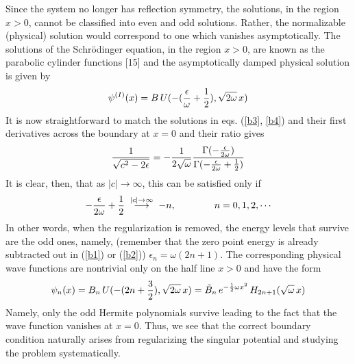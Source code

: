 \documentclass[a4paper,11pt]{article}
\begin{document}
Since the system no longer has reflection symmetry, the solutions, in
the region $x>0$,
cannot be classified into even and odd solutions. Rather, the
normalizable (physical)
solution would correspond to one which vanishes asymptotically. The
solutions of the Schr\"{o}dinger equation, in the region $x>0$, are
known as the parabolic cylinder functions [15] and the asymptotically
damped physical solution is given by
\begin{equation}
\psi^{(I)}(x) = B\,U(-({\epsilon\over\omega}+{1\over 2}),
\sqrt{2\omega}\,x)\label{b4} 
\end{equation}
It is now straightforward to match the solutions in eqs. (\ref{b3},
\ref{b4}) and their first derivatives across the boundary at $x=0$ and
their ratio gives
\begin{equation}
\frac{1}{\sqrt{c^{2}-2\epsilon}} =
-\frac{1}{2\sqrt{\omega}}\frac{\Gamma(-{\epsilon\over
2\omega})}{\Gamma(-{\epsilon\over 2\omega}+{1\over 2})}\label{b6}
\end{equation}
It is clear, then, that as $|c|\rightarrow \infty$, this can be
satisfied only if
\begin{equation}
-{\epsilon\over 2\omega} + {1\over 2}\;
 \stackrel{|c|\rightarrow\infty}{\longrightarrow}\; -n,\qquad\qquad
 n=0,1,2,\cdots\label{b7} 
\end{equation}
In other words, when the regularization is removed, the energy levels
that survive are the odd ones, namely, (remember that the zero point
energy is already subtracted out in (\ref{b1}) or (\ref{b2}))
$\epsilon_{n} = \omega (2n + 1)$.
The corresponding physical wave functions are nontrivial only on the half
line $x>0$ and have the form
\begin{equation}
\psi_{n}(x) = B_{n}\,U(-(2n+{3\over 2}), \sqrt{2\omega}\,x) =
\tilde{B}_{n}\,e^{-{1\over 2}\omega
x^{2}}\,H_{2n+1}(\sqrt{\omega}\,x)\label{b9}
\end{equation}
Namely, only the odd Hermite polynomials survive leading to the fact
that the wave function vanishes at $x=0$. Thus, we see that the
correct boundary condition naturally arises from regularizing the
singular potential and studying the problem systematically.
\end{document}
